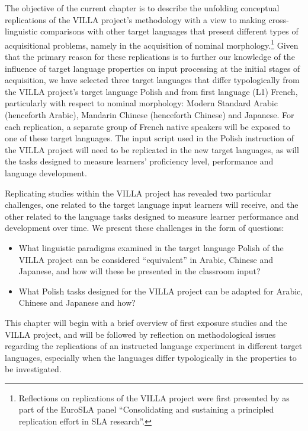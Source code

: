\documentclass[output=paper,colorlinks,citecolor=brown,modfonts,nonflat]{../langscibook}
\begin{document}
The objective of the current chapter is to describe the unfolding conceptual replications of the VILLA project’s methodology with a view to making cross-linguistic comparisons with other target languages that present different types of acquisitional problems, namely in the acquisition of nominal morphology.\footnote{{Reflections on replications of the VILLA project were first presented by \citet{RastEtAl2017} as part of the EuroSLA panel “Consolidating and sustaining a principled replication effort in SLA research”.}} Given that the primary reason for these replications is to further our knowledge of the influence of target language properties on input processing at the initial stages of acquisition, we have selected three target languages that differ typologically from the VILLA project’s target language Polish and from first language (L1) French, particularly with respect to nominal morphology: Modern Standard Arabic (henceforth Arabic), Mandarin Chinese (henceforth Chinese) and Japanese. For each replication, a separate group of French native speakers will be exposed to one of these target languages. The input script used in the Polish instruction of the VILLA project will need to be replicated in the new target languages, as will the tasks designed to measure learners’ proficiency level, performance and language development.

Replicating studies within the VILLA project has revealed two particular challenges, one related to the target language input learners will receive, and the other related to the language tasks designed to measure learner performance and development over time. We present these challenges in the form of questions:

\begin{itemize}
    \item What linguistic paradigms examined in the target language Polish of the VILLA project can be considered “equivalent” in Arabic, Chinese and Japanese, and how will these be presented in the classroom input?
    \item What Polish tasks designed for the VILLA project can be adapted for Arabic, Chinese and Japanese and how?
\end{itemize}

This chapter will begin with a brief overview of first exposure studies and the VILLA project, and will be followed by reflection on methodological issues regarding the replications of an instructed language experiment in different target languages, especially when the languages differ typologically in the properties to be investigated.
\end{document}
